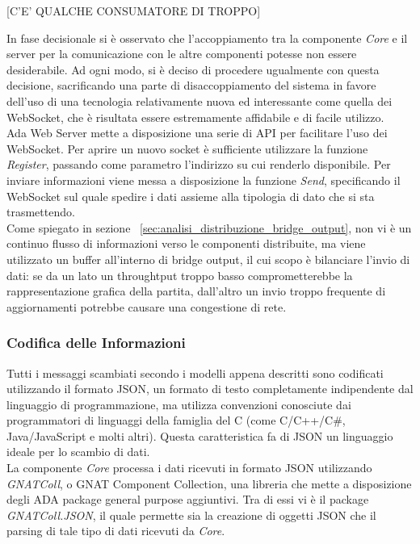[C'E' QUALCHE CONSUMATORE DI TROPPO]

In fase decisionale si è osservato che l'accoppiamento tra la componente \emph{Core} e il server per la comunicazione con le altre componenti potesse non essere desiderabile. Ad ogni modo, si è deciso di procedere ugualmente con questa decisione, sacrificando una parte di disaccoppiamento del sistema in favore dell'uso di una tecnologia relativamente nuova ed interessante come quella dei WebSocket, che è risultata essere estremamente affidabile e di facile utilizzo.\\

Ada Web Server mette a disposizione una serie di API per facilitare l'uso dei WebSocket. Per aprire un nuovo socket \`{e} sufficiente utilizzare la funzione \emph{Register}, passando come parametro l'indirizzo su cui renderlo disponibile. Per inviare informazioni viene messa a disposizione la funzione \emph{Send}, specificando il WebSocket sul quale spedire i dati assieme alla tipologia di dato che si sta trasmettendo.\\

Come spiegato in sezione ~\ref{sec:analisi_distribuzione_bridge_output}, non vi \`{e} un continuo flusso di informazioni verso le componenti distribuite, ma viene utilizzato un buffer all'interno di bridge output, il cui scopo \`{e} bilanciare l'invio di dati: se da un lato un throughtput troppo basso comprometterebbe la rappresentazione grafica della partita, dall'altro un invio troppo frequente di aggiornamenti potrebbe causare una congestione di rete.

\subsubsection{Codifica delle Informazioni}
Tutti i messaggi scambiati secondo i modelli appena descritti sono codificati utilizzando il formato JSON, un formato di testo completamente indipendente dal linguaggio di programmazione, ma utilizza convenzioni conosciute dai programmatori di linguaggi della famiglia del C (come C/C++/C\#, Java/JavaScript e molti altri). Questa caratteristica fa di JSON un linguaggio ideale per lo scambio di dati.\\

La componente \emph{Core} processa i dati ricevuti in formato JSON utilizzando \emph{GNATColl}, o GNAT Component Collection, una libreria che mette a disposizione degli ADA package general purpose aggiuntivi. Tra di essi vi \`{e} il package \emph{GNATColl.JSON}, il quale permette sia la creazione di oggetti JSON che il parsing di tale tipo di dati ricevuti da \emph{Core}.\\

